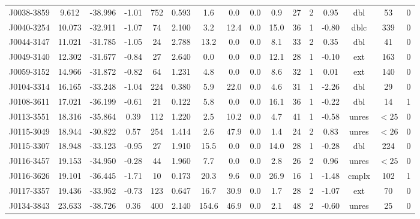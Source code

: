 \documentclass{mnras}
\begin{document}
\begin{table*}
\begin{tabular}{cccccccccccccccc}
J0038-3859 & 9.612 & -38.996 & -1.01 & 752 & 0.593 & 1.6 & 0.0 & 0.0 & 0.9 & 27 & 2 & 0.95 & dbl & 53 & 0 \\ 

J0040-3254 & 10.073 & -32.911 & -1.07 & 74 & 2.100 & 3.2 & 12.4 & 0.0 & 15.0 & 36 & 1 & -0.80 & dblc & 339 & 0 \\ 

J0044-3147 & 11.021 & -31.785 & -1.05 & 24 & 2.788 & 13.2 & 0.0 & 0.0 & 8.1 & 33 & 2 & 0.35 & dbl & 41 & 0 \\ 

J0049-3140 & 12.302 & -31.677 & -0.84 & 27 & 2.640 & 0.0 & 0.0 & 0.0 & 12.1 & 28 & 1 & -0.10 & ext & 163 & 0 \\ 

J0059-3152 & 14.966 & -31.872 & -0.82 & 64 & 1.231 & 4.8 & 0.0 & 0.0 & 8.6 & 32 & 1 & 0.01 & ext & 140 & 0 \\ 

J0104-3314 & 16.165 & -33.248 & -1.04 & 224 & 0.380 & 5.9 & 22.0 & 0.0 & 4.6 & 31 & 1 & -2.26 & dbl & 29 & 0 \\ 

J0108-3611 & 17.021 & -36.199 & -0.61 & 21 & 0.122 & 5.8 & 0.0 & 0.0 & 16.1 & 36 & 1 & -0.22 & dbl & 14 & 1 \\ 

J0113-3551 & 18.316 & -35.864 & 0.39 & 112 & 1.220 & 2.5 & 10.2 & 0.0 & 4.7 & 41 & 1 & -0.58 & unres & $<25$ & 0 \\ 

J0115-3049 & 18.944 & -30.822 & 0.57 & 254 & 1.414 & 2.6 & 47.9 & 0.0 & 1.4 & 24 & 2 & 0.83 & unres & $<26$ & 0 \\ 

J0115-3307 & 18.948 & -33.123 & -0.95 & 27 & 1.910 & 15.5 & 0.0 & 0.0 & 14.0 & 28 & 1 & -0.28 & dbl & 224 & 0 \\ 

J0116-3457 & 19.153 & -34.950 & -0.28 & 44 & 1.960 & 7.7 & 0.0 & 0.0 & 2.8 & 26 & 2 & 0.96 & unres & $<25$ & 0 \\ 

J0116-3626 & 19.101 & -36.445 & -1.71 & 10 & 0.173 & 20.3 & 9.6 & 0.0 & 26.9 & 16 & 1 & -1.48 & cmplx & 102 & 1 \\ 

J0117-3357 & 19.436 & -33.952 & -0.73 & 123 & 0.647 & 16.7 & 30.9 & 0.0 & 1.7 & 28 & 2 & -1.07 & ext & 70 & 0 \\ 

J0134-3843 & 23.633 & -38.726 & 0.36 & 400 & 2.140 & 154.6 & 46.9 & 0.0 & 2.1 & 48 & 2 & -0.60 & unres & 25 & 0 \\ 


\end{tabular}
\end{table*}
\end{document}
